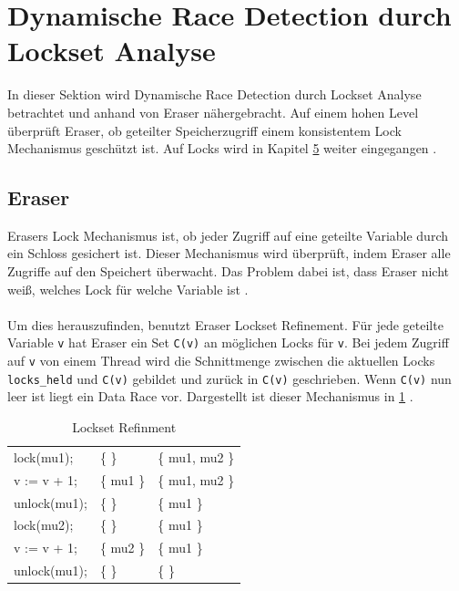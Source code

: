 \section{Dynamische Race Detection durch Lockset Analyse}

In dieser Sektion wird Dynamische Race Detection durch Lockset Analyse betrachtet und anhand von Eraser nähergebracht. Auf einem hohen Level überprüft Eraser, ob geteilter Speicherzugriff einem konsistentem Lock Mechanismus geschützt ist. Auf Locks wird in Kapitel \hyperref[sec:loesen]{5} weiter eingegangen \cite[vgl.][392]{savage_eraser_nodate}.

\subsection*{Eraser}

Erasers Lock Mechanismus ist, ob jeder Zugriff auf eine geteilte Variable durch ein Schloss gesichert ist. Dieser Mechanismus wird überprüft, indem Eraser alle Zugriffe auf den Speichert überwacht. Das Problem dabei ist, dass Eraser nicht weiß, welches Lock für welche Variable ist \cite[vgl.][396]{savage_eraser_nodate}. \\
\\
Um dies herauszufinden, benutzt Eraser Lockset Refinement. Für jede geteilte Variable \texttt{v} hat Eraser ein Set \texttt{C(v)} an möglichen Locks für \texttt{v}. Bei jedem Zugriff auf \texttt{v} von einem Thread wird die Schnittmenge zwischen die aktuellen Locks \texttt{locks\_held} und \texttt{C(v)} gebildet und zurück in \texttt{C(v)} geschrieben. Wenn \texttt{C(v)} nun leer ist liegt ein Data Race vor. Dargestellt ist dieser Mechanismus in \ref{tab:locksetRefinment} \cite[vgl.][396-397]{savage_eraser_nodate}. 

\begin{table}[h]
    \myfloatalign
    \begin{tabularx}{\textwidth}{XXX} \toprule
        \tableheadline{Program} & \tableheadline{locks\_held}
        & \tableheadline{C(v)} \\ 
        \midrule
        lock(mu1); & \{ \} &  \{ mu1, mu2 \} \\
        v := v + 1; & \{ mu1 \} & \{ mu1, mu2 \} \\
        unlock(mu1); & \{ \} & \{ mu1 \} \\
        \midrule
        lock(mu2); & \{ \} & \{ mu1 \} \\
        v := v + 1; & \{ mu2 \} & \{ mu1 \} \\
        unlock(mu1); & \{ \} & \{ \} \\
        \bottomrule
    \end{tabularx}
    \caption[Lockset Refinment]{Lockset Refinment \cite[397]{savage_eraser_nodate}}
    \label{tab:locksetRefinment}
\end{table}

